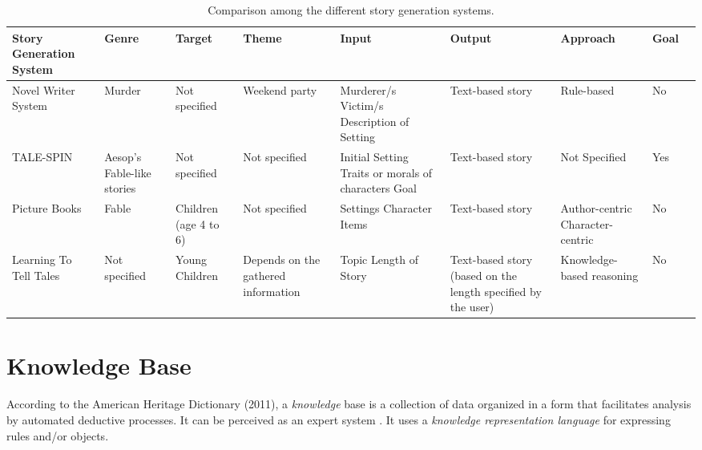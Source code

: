 \begin{sidewaystable}[ph!]   %
\centering
\caption{Comparison among the different story generation systems.} \vspace{0.25em}
\begin{tabular}{|p{1in}|p{2cm}|p{2cm}|p{2cm}|p{2cm}|p{2cm}|p{2cm}|p{2cm}|p{2cm}|} \hline
\centering Story Generation System & Genre & Target & Theme & Input & Output & Approach & Goal \\ \hline
Novel Writer System & Murder & Not specified & Weekend party & Murderer/s \newline Victim/s \newline Description of Setting & Text-based story & Rule-based & No\\ \hline
TALE-SPIN & Aesop's Fable-like stories & Not specified & Not specified & Initial Setting \newline Traits or morals of characters \newline Goal & Text-based story & Not Specified & Yes \\ \hline
Picture Books & Fable & Children (age 4 to 6) & Not specified & Settings \newline Character \newline Items & Text-based story & Author-centric \newline Character-centric & No \\ \hline
Learning To Tell Tales & Not specified  & Young Children  & Depends on the gathered information & Topic \newline Length of Story & Text-based story (based on the length specified by the user) & Knowledge-based reasoning & No \\ \hline
\end{tabular}
\label{tab:StorytellingSystems}
\end{sidewaystable}
\clearpage

\section{Knowledge Base}
According to the American Heritage Dictionary (2011), a \textit{knowledge} base is a collection of data organized in a form that facilitates analysis by automated deductive processes. It can be perceived as an expert system \cite{mars1995towards}. It uses a \textit{knowledge representation language} for expressing rules and/or objects.

